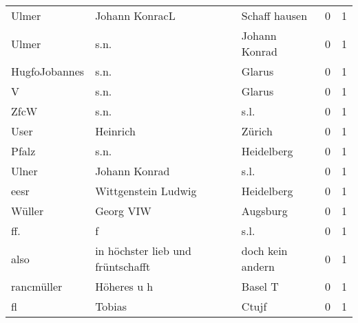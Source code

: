 \documentclass[10pt,a4paper,landscape]{article}
\begin{document}
\begin{longtable}{llllrr}
                    Ulmer &                     Johann KonracL &             &                               Schaff hausen &          0 &         1 \\
                    Ulmer &                               s.n. &             &                               Johann Konrad &          0 &         1 \\
            HugfoJobannes &                               s.n. &             &                                      Glarus &          0 &         1 \\
                        V &                               s.n. &             &                                      Glarus &          0 &         1 \\
                     ZfcW &                               s.n. &             &                                        s.l. &          0 &         1 \\
                     User &                           Heinrich &             &                                      Zürich &          0 &         1 \\
                    Pfalz &                               s.n. &             &                                  Heidelberg &          0 &         1 \\
                    Ulner &                      Johann Konrad &             &                                        s.l. &          0 &         1 \\
                     eesr &                Wittgenstein Ludwig &             &                                  Heidelberg &          0 &         1 \\
                   Wüller &                          Georg VIW &             &                                    Augsburg &          0 &         1 \\
                      ff. &                                  f &             &                                        s.l. &          0 &         1 \\
                     also &  in höchster lieb und früntschafft &             &                            doch kein andern &          0 &         1 \\
               rancmüller &                        Höheres u h &             &                                     Basel T &          0 &         1 \\
                       fl &                             Tobias &             &                                       Ctujf &          0 &         1 \\

\end{longtable}
\end{document}
